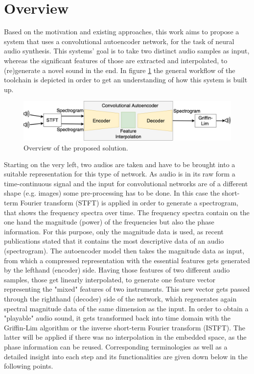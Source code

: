 \section{Overview}
\label{sec:app_overview}
Based on the motivation and existing approaches, this work aims to propose a system that uses a convolutional autoencoder network, for the task of neural audio synthesis. This systems' goal is to take two distinct audio samples as input, whereas the significant features of those are extracted and interpolated, to (re)generate a novel sound in the end. In figure \ref{fig:toolchain} the general workflow of the toolchain is depicted in order to get an understanding of how this system is built up. 

 \begin{figure}[htb!]
	\caption{Overview of the proposed solution.}
	\label{fig:toolchain}
	\centering
	\includegraphics[width=\textwidth]{images/approach/Toolchain.png}
\end{figure}

Starting on the very left, two audios are taken and have to be brought into a suitable representation for this type of network. As audio is in its raw form a time-continuous signal and the input for convolutional networks are of a different shape (e.g. images) some pre-processing has to be done. In this case the short-term Fourier transform (STFT) is applied in order to generate a spectrogram, that shows the frequency spectra over time. The frequency spectra contain on the one hand the magnitude (power) of the frequencies but also the phase information. For this purpose, only the magnitude data is used, as recent publications stated that it contains the most descriptive data of an audio (spectrogram). The autoencoder model then takes the magnitude data as input, from which a compressed representation with the essential features gets generated by the lefthand (encoder) side. Having those features of two different audio samples, those get linearly interpolated, to generate one feature vector representing the "mixed" features of two instruments. This new vector gets passed through the righthand (decoder) side of the network, which regenerates again spectral magnitude data of the same dimension as the input. In order to obtain a "playable" audio sound, it gets transformed back into time domain with the Griffin-Lim algorithm \cite{Griffin1984} or the inverse short-term Fourier transform (ISTFT). The latter will be applied if there was no interpolation in the embedded space, as the phase information can be reused. Corresponding terminologies as well as a detailed insight into each step and its functionalities are given down below in the following points.


